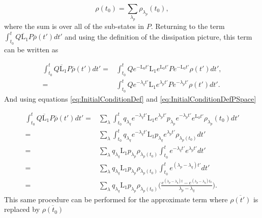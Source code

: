 \documentclass[12pt]{article}
\begin{document}
\begin{equation}\label{eq:InitialConditionDefPSpace}
    \rho(t_0) = \sum_{\lambda_p} \rho_{\lambda_p}(t_0),
\end{equation} where the sum is over all of the sub-states in $P$. Returning to the term $\int_{t_0}^t Q\overline{\mathrm{L}}_1P\overline{\rho}(t') dt'$ and using the definition of the dissipation picture, this term can be written as

\begin{align}
    \int_{t_0}^t Q\overline{\mathrm{L}}_1P\overline{\rho}(t') dt'=&\int_{t_0}^t Qe^{-\mathrm{L}_0 t'}\mathrm{L}_1e^{\mathrm{L}_0 t'}Pe^{-\mathrm{L}_0 t'}\rho(t') dt', \nonumber \\
    =&\int_{t_0}^t Qe^{-\lambda_q t'}\mathrm{L}_1e^{\lambda_p t'}Pe^{-\lambda_p t'}\rho(t') dt'.
\end{align} And using equations \eqref{eq:InitialConditionDef} and \eqref{eq:InitialConditionDefPSpace}

\begin{align}
  \int_{t_0}^t Q\overline{\mathrm{L}}_1P\overline{\rho}(t') dt'=&\sum_{\lambda}\int_{t_0}^t q_{\lambda_q} e^{-\lambda_q t'}\mathrm{L}_1e^{\lambda_p t'}p_{\lambda_p} e^{-\lambda_p t'}e^{\mathrm{L}_0 t'}\rho_{\lambda_p}(t_0)dt' \\
  =& \sum_{\lambda}\int_{t_0}^t q_{\lambda_q} e^{-\lambda_q t'}\mathrm{L}_1p_{\lambda_q} e^{\lambda_p t'}\rho_{\lambda_p(t_0)} \nonumber dt' \\
  =& \sum_{\lambda} q_{\lambda_q} \mathrm{L}_1p_{\lambda_p}\rho_{\lambda_p(t_0)} \int_{t_0}^t e^{-\lambda_q t'} e^{\lambda_p t'} dt' \nonumber \\
  =&\sum_{\lambda} q_{\lambda_q} \mathrm{L}_1p_{\lambda_p}\rho_{\lambda_p(t_0)} \int_{t_0}^t e^{(\lambda_p-\lambda_q) t'}dt' \nonumber \\
  =&\sum_{\lambda} q_{\lambda_q} \mathrm{L}_1p_{\lambda_p}\rho_{\lambda_p(t_0)} \Bigg(\frac{e^{(\lambda_p-\lambda_q) t}-e^{(\lambda_p-\lambda_q) t_0}}{\lambda_p-\lambda_q}\Bigg).\nonumber
\end{align} This same procedure can be performed for the approximate term where $\overline{\rho(t')}$ is replaced by $\overline{\rho(t_0)}$
\end{document}
